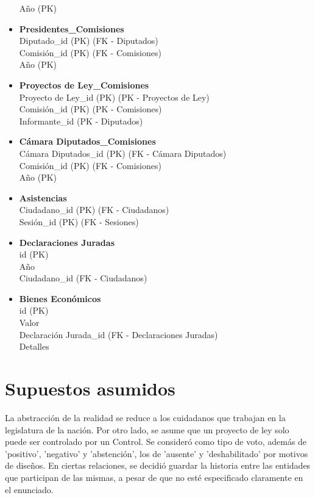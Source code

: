 \begin{itemize}
	Año (PK) 
	\item \textbf{Presidentes\_Comisiones} \\
	Diputado\_id (PK) (FK - Diputados) \\
	Comisión\_id (PK) (FK - Comisiones) \\
	Año (PK)
	\item \textbf{Proyectos de Ley\_Comisiones} \\
	Proyecto de Ley\_id (PK) (PK - Proyectos de Ley) \\
	Comisión\_id (PK) (PK - Comisiones) \\
	Informante\_id (PK - Diputados)
	\item \textbf{Cámara Diputados\_Comisiones }\\
	Cámara Diputados\_id (PK) (FK - Cámara Diputados) \\
	Comisión\_id  (PK) (FK - Comisiones) \\
	Año (PK)
	\item \textbf{Asistencias} \\
	Ciudadano\_id (PK) (FK - Ciudadanos) \\
	Sesión\_id (PK) (FK - Sesiones)
	\item \textbf{Declaraciones Juradas} \\
	id (PK) \\
	Año \\
	Ciudadano\_id (FK - Ciudadanos)
	\item \textbf{Bienes Económicos} \\
	id (PK) \\
	Valor \\
	Declaración Jurada\_id (FK - Declaraciones Juradas) \\
	Detalles \\ 
	
\end{itemize}

\newpage

\section{Supuestos asumidos}
La abstracción de la realidad se reduce a los cuidadanos que trabajan en la legislatura de la nación.
Por otro lado, se asume que un proyecto de ley solo puede ser controlado por un Control.
Se consideró como tipo de voto, además de 'positivo', 'negativo' y 'abstención', los de 'ausente' y 'deshabilitado' por motivos de diseños.
En ciertas relaciones, se decidió guardar la historia entre las entidades que participan de las mismas, a pesar de que no esté especificado claramente en el enunciado.



